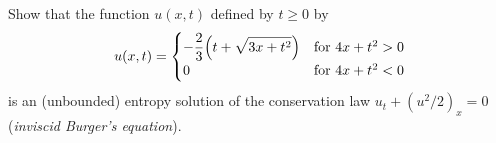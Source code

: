 \begin{problem}
  Show that the function \(u(x,t)\) defined by \(t\geq 0\) by
  \[
    u(x,t)=
    \begin{cases}
      \displaystyle-\frac{2}{3}\Bigl(t+\sqrt{3x+t^2}\Bigr)
      &\text{for \(4x+t^2>0\)}\\
      0
      &\text{for \(4x+t^2<0\)}
    \end{cases}
  \]
  is an (unbounded) entropy solution of the conservation law
  \(u_t+(u^2/2)_x=0\) (\emph{inviscid Burger's equation}).
\end{problem}
\begin{solution}
\end{solution}

